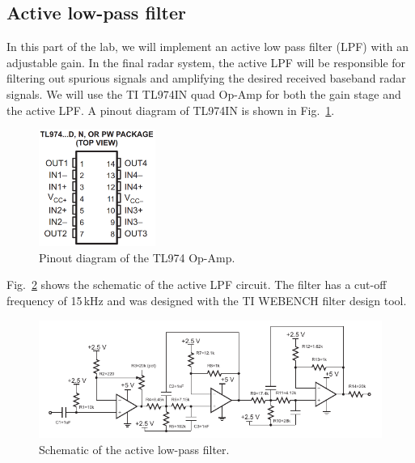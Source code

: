 \documentclass[letterpaper, 11pt]{article}
\begin{document}
\subsection{Active low-pass filter}
\label{sec:lpf}

In this part of the lab, we will implement an active low pass filter (LPF) with an adjustable gain. In the final radar system, the active LPF will be responsible for filtering out spurious signals and amplifying the desired received baseband radar signals. We will use the TI TL974IN quad Op-Amp for both the gain stage and the active LPF. A pinout diagram of TL974IN is shown in Fig.~\ref{fig:tl974-pinout}. 

\begin{figure}[h]
	\centering
	\includegraphics[width=1.5in]{tl974-pinout}
	\caption{Pinout diagram of the TL974 Op-Amp.}
	\label{fig:tl974-pinout}
\end{figure}

Fig.~\ref{fig:lpf-sch} shows the schematic of the active LPF circuit. The filter has a cut-off frequency of 15\,kHz and was designed with the TI WEBENCH filter design tool.  





\begin{figure}[h]
	\centering
	\includegraphics[width=5.3in]{lpf-sch}
	\caption{Schematic of the active low-pass filter.}
	\label{fig:lpf-sch}
\end{figure}
\end{document}
